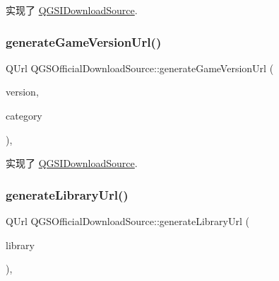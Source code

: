 实现了 \mbox{\hyperlink{class_q_g_s_i_download_source_acf738f516ec5ce173d8a346dfe65976a}{Q\+G\+S\+I\+Download\+Source}}.

\mbox{\label{class_q_g_s_official_download_source_acb74743d3cdc6c2211e56aa0e5b16b93}} 
\subsubsection{\texorpdfstring{generate\+Game\+Version\+Url()}{generateGameVersionUrl()}}
{\footnotesize\ttfamily Q\+Url Q\+G\+S\+Official\+Download\+Source\+::generate\+Game\+Version\+Url (\begin{DoxyParamCaption}\item[{const \mbox{\hyperlink{class_q_g_s_game_version}{Q\+G\+S\+Game\+Version}} \&}]{version,  }\item[{const Q\+String \&}]{category }\end{DoxyParamCaption})\hspace{0.3cm}{\ttfamily [override]}, {\ttfamily [virtual]}}



实现了 \mbox{\hyperlink{class_q_g_s_i_download_source_a59b370202b6c3459d70cf6e7f84273e1}{Q\+G\+S\+I\+Download\+Source}}.

\mbox{\label{class_q_g_s_official_download_source_a07d41c6aed39acc0cdc071b374ce04bc}} 
\subsubsection{\texorpdfstring{generate\+Library\+Url()}{generateLibraryUrl()}}
{\footnotesize\ttfamily Q\+Url Q\+G\+S\+Official\+Download\+Source\+::generate\+Library\+Url (\begin{DoxyParamCaption}\item[{const \mbox{\hyperlink{class_q_g_s_library}{Q\+G\+S\+Library}} \&}]{library }\end{DoxyParamCaption})\hspace{0.3cm}{\ttfamily [override]}, {\ttfamily [virtual]}}



